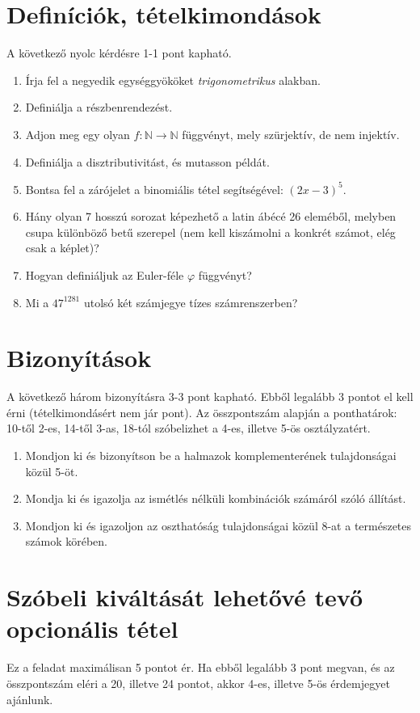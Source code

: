 \documentclass[11pt,a4paper]{article}
\begin{document}
\section{Definíciók, tételkimondások}
A következő nyolc kérdésre 1-1 pont kapható. 
\begin{enumerate}\setlength{\itemsep}{2.2cm}

\item Írja fel a negyedik egységgyököket \emph{trigonometrikus} alakban.
\item Definiálja a részbenrendezést.
\item Adjon meg egy olyan $f\colon \mathbb{N}\to \mathbb{N}$ függvényt, mely szürjektív, de nem injektív.
\item Definiálja a disztributivitást, és mutasson példát.

\item Bontsa fel a zárójelet a binomiális tétel segítségével: $(2x-3)^5$.
\item Hány olyan 7 hosszú sorozat képezhető a latin ábécé 26 eleméből, melyben csupa különböző betű szerepel (nem kell kiszámolni a konkrét számot, elég csak a képlet)?
\item Hogyan definiáljuk az Euler-féle $\varphi$ függvényt?
\item Mi a $47^{1281}$ utolsó két számjegye tízes számrenszerben?


\end{enumerate}

\newpage
\section{Bizonyítások}
A következő három bizonyításra 3-3 pont kapható. Ebből legalább 3 pontot el kell érni (tételkimondásért nem jár pont).
Az összpontszám alapján a ponthatárok: 10-től 2-es, 14-től 3-as, 18-tól szóbelizhet a 4-es, illetve 5-ös osztályzatért.
\begin{enumerate}

\item Mondjon ki és bizonyítson be a halmazok komplementerének tulajdonságai közül 5-öt.
\item Mondja ki és igazolja az ismétlés nélküli kombinációk számáról szóló állítást.
\item Mondjon ki és igazoljon az oszthatóság tulajdonságai közül 8-at a természetes számok körében.

\end{enumerate}


\section{Szóbeli kiváltását lehetővé tevő opcionális tétel}
Ez a feladat maximálisan 5 pontot ér. Ha ebből legalább 3 pont megvan, és az összpontszám eléri a 20, illetve 24 pontot, akkor 4-es, illetve 5-ös érdemjegyet ajánlunk.
\end{document}
